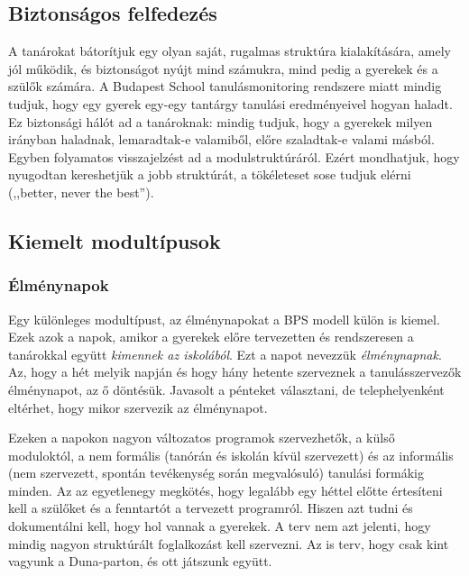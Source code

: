 \hypertarget{biztonsagos-felfedezes}{%
\subsection{Biztonságos felfedezés}\label{biztonsagos-felfedezes}}

A tanárokat bátorítjuk egy olyan saját, rugalmas struktúra
kialakítására, amely jól működik, és biztonságot nyújt mind számukra,
mind pedig a gyerekek és a szülők számára. A Budapest School tanulásmonitoring rendszere miatt mindig tudjuk, hogy egy gyerek egy-egy
tantárgy tanulási eredményeivel hogyan haladt. Ez biztonsági hálót ad a
tanároknak: mindig tudjuk, hogy a gyerekek milyen irányban haladnak,
lemaradtak-e valamiből, előre szaladtak-e valami másból. Egyben
folyamatos visszajelzést ad a modulstruktúráról. Ezért mondhatjuk, hogy
nyugodtan kereshetjük a jobb struktúrát, a tökéleteset sose tudjuk
elérni (,,better, never the best'').

\hypertarget{kiemelt-modultipusok}{%
\subsection{Kiemelt modultípusok}\label{kiemelt-modultipusok}}

\hypertarget{elmenynapok}{%
\subsubsection{Élménynapok}\label{elmenynapok}}

Egy különleges modultípust, az élménynapokat a BPS modell külön is
kiemel. Ezek azok a napok, amikor a gyerekek előre tervezetten és
rendszeresen a tanárokkal együtt \emph{kimennek az iskolából}. Ezt a
napot nevezzük \emph{élménynapnak}. Az, hogy a hét melyik napján és hogy
hány hetente szerveznek a tanulásszervezők élménynapot, az ő
döntésük. Javasolt a pénteket választani, de telephelyenként eltérhet,
hogy mikor szervezik az élménynapot.

Ezeken a napokon nagyon változatos programok szervezhetők, a külső
moduloktól, a nem formális (tanórán és iskolán kívül szervezett) és az
informális (nem szervezett, spontán tevékenység során megvalósuló)
tanulási formákig minden. Az az egyetlenegy megkötés, hogy legalább egy
héttel előtte értesíteni kell a szülőket és a fenntartót a tervezett
programról. Hiszen azt tudni és dokumentálni kell, hogy hol vannak a
gyerekek. A terv nem azt jelenti, hogy mindig nagyon struktúrált
foglalkozást kell szervezni. Az is terv, hogy csak kint vagyunk a Duna-parton, és ott játszunk együtt.

